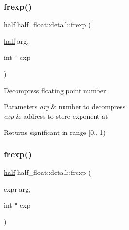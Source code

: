 \mbox{\label{namespacehalf__float_1_1detail_ac50a04fe4afdfae67b7aeb163fa92c72}} 
\subsubsection{\texorpdfstring{frexp()}{frexp()}\hspace{0.1cm}{\footnotesize\ttfamily [1/2]}}
{\footnotesize\ttfamily \hyperlink{classhalf__float_1_1half}{half} half\+\_\+float\+::detail\+::frexp (\begin{DoxyParamCaption}\item[{\hyperlink{classhalf__float_1_1half}{half}}]{arg,  }\item[{int $\ast$}]{exp }\end{DoxyParamCaption})\hspace{0.3cm}{\ttfamily [inline]}}

Decompress floating point number. 
\begin{DoxyParams}{Parameters}
{\em arg} & number to decompress \\
\hline
{\em exp} & address to store exponent at \\
\hline
\end{DoxyParams}
\begin{DoxyReturn}{Returns}
significant in range \mbox{[}0., 1) 
\end{DoxyReturn}
\mbox{\label{namespacehalf__float_1_1detail_ab852ae178e7de565f1731acb2b1cb9f1}} 
\subsubsection{\texorpdfstring{frexp()}{frexp()}\hspace{0.1cm}{\footnotesize\ttfamily [2/2]}}
{\footnotesize\ttfamily \hyperlink{classhalf__float_1_1half}{half} half\+\_\+float\+::detail\+::frexp (\begin{DoxyParamCaption}\item[{\hyperlink{structhalf__float_1_1detail_1_1expr}{expr}}]{arg,  }\item[{int $\ast$}]{exp }\end{DoxyParamCaption})\hspace{0.3cm}{\ttfamily [inline]}}

